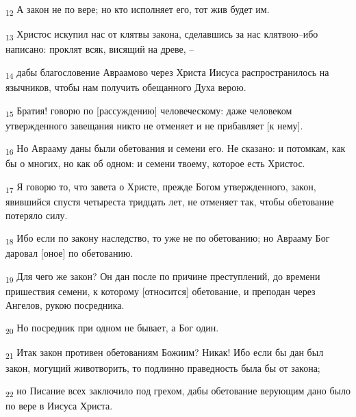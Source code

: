 \begin{tcolorbox}
\textsubscript{12} А закон не по вере; но кто исполняет его, тот жив будет им.
\end{tcolorbox}
\begin{tcolorbox}
\textsubscript{13} Христос искупил нас от клятвы закона, сделавшись за нас клятвою--ибо написано: проклят всяк, висящий на древе, --
\end{tcolorbox}
\begin{tcolorbox}
\textsubscript{14} дабы благословение Авраамово через Христа Иисуса распространилось на язычников, чтобы нам получить обещанного Духа верою.
\end{tcolorbox}
\begin{tcolorbox}
\textsubscript{15} Братия! говорю по [рассуждению] человеческому: даже человеком утвержденного завещания никто не отменяет и не прибавляет [к нему].
\end{tcolorbox}
\begin{tcolorbox}
\textsubscript{16} Но Аврааму даны были обетования и семени его. Не сказано: и потомкам, как бы о многих, но как об одном: и семени твоему, которое есть Христос.
\end{tcolorbox}
\begin{tcolorbox}
\textsubscript{17} Я говорю то, что завета о Христе, прежде Богом утвержденного, закон, явившийся спустя четыреста тридцать лет, не отменяет так, чтобы обетование потеряло силу.
\end{tcolorbox}
\begin{tcolorbox}
\textsubscript{18} Ибо если по закону наследство, то уже не по обетованию; но Аврааму Бог даровал [оное] по обетованию.
\end{tcolorbox}
\begin{tcolorbox}
\textsubscript{19} Для чего же закон? Он дан после по причине преступлений, до времени пришествия семени, к которому [относится] обетование, и преподан через Ангелов, рукою посредника.
\end{tcolorbox}
\begin{tcolorbox}
\textsubscript{20} Но посредник при одном не бывает, а Бог один.
\end{tcolorbox}
\begin{tcolorbox}
\textsubscript{21} Итак закон противен обетованиям Божиим? Никак! Ибо если бы дан был закон, могущий животворить, то подлинно праведность была бы от закона;
\end{tcolorbox}
\begin{tcolorbox}
\textsubscript{22} но Писание всех заключило под грехом, дабы обетование верующим дано было по вере в Иисуса Христа.
\end{tcolorbox}
